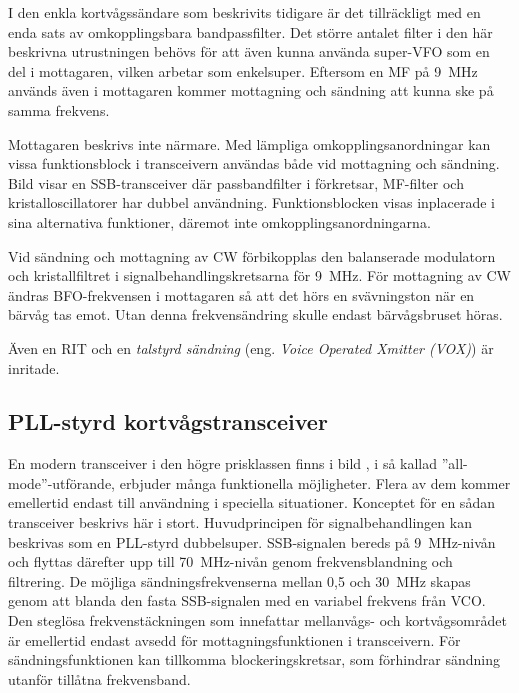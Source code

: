 I den enkla kortvågssändare som beskrivits tidigare är det
tillräckligt med en enda sats av omkopplingsbara bandpassfilter.
Det större antalet filter i den här beskrivna utrustningen behövs för att
även kunna använda super-VFO som en del i mottagaren, vilken arbetar
som enkelsuper.
Eftersom en MF på \qty{9}{\mega\hertz} används även i mottagaren kommer
mottagning och sändning att kunna ske på samma frekvens.

Mottagaren beskrivs inte närmare.
Med lämpliga omkopplingsanordningar kan vissa funktionsblock i
transceivern användas både vid mottagning och sändning.
Bild  visar en SSB-transceiver där passbandfilter i
förkretsar, MF-filter och kristalloscillatorer har dubbel användning.
Funktionsblocken visas inplacerade i sina alternativa
funktioner, däremot inte omkopplingsanordningarna.

Vid sändning och mottagning av CW förbikopplas den balanserade modulatorn och
kristallfiltret i signalbehandlingskretsarna för \qty{9}{\mega\hertz}.
För mottagning av CW ändras BFO-frekvensen i mottagaren så att
det hörs en svävningston när en bärvåg tas emot.
Utan denna frekvensändring skulle endast bärvågsbruset höras.

Även en RIT och en \emph{talstyrd sändning} (eng.
\emph{Voice Operated Xmitter (VOX)}) är inritade.


\newpage
{}

\subsection{PLL-styrd kortvågstransceiver}

En modern transceiver i den högre prisklassen finns i bild ,
i så kallad ''all-mode''-utförande, erbjuder många funktionella möjligheter.
Flera av dem kommer emellertid endast till användning i speciella situationer.
Konceptet för en sådan transceiver beskrivs här i stort.
Huvudprincipen för signalbehandlingen kan beskrivas som en PLL-styrd
dubbelsuper.
SSB-signalen bereds på \qty{9}{\mega\hertz}-nivån och flyttas därefter upp till
\qty{70}{\mega\hertz}-nivån genom frekvensblandning och filtrering.
De möjliga sändningsfrekvenserna mellan 0,5 och \qty{30}{\mega\hertz} skapas
genom att blanda den fasta SSB-signalen med en variabel frekvens från VCO.
Den steglösa frekvenstäckningen som innefattar mellanvågs- och kortvågsområdet
är emellertid endast avsedd för mottagningsfunktionen i transceivern.
För sändningsfunktionen kan tillkomma blockeringskretsar, som förhindrar
sändning utanför tillåtna frekvensband.

